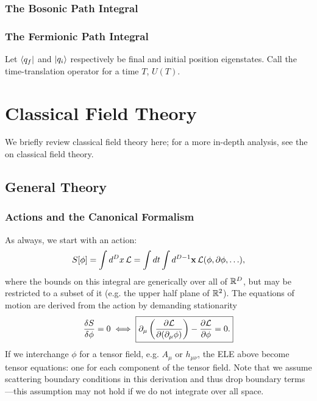 \documentclass[11pt]{article}
\newcommand{\fd}[2]{\frac{\delta #1}{\delta #2}} %
\begin{document}
\subsubsection{The Bosonic Path Integral}


\subsubsection{The Fermionic Path Integral}

\begin{iidea}
    Let $\langle q_f\rvert$ and $\lvert q_i\rangle$ respectively be final
    and initial position eigenstates. Call the time-translation
    operator for a time $T$, $U(T)$. 
\end{iidea}


\section{Classical Field Theory}

We briefly review classical field theory here; for a more in-depth analysis,
see the  on classical field theory.

\subsection{General Theory}

\subsubsection{Actions and the Canonical Formalism}

As always, we start with an action:
\begin{align*}
    S[\phi] = \int d^D x \, \mathcal{L} = \int dt \int d^{D - 1}\mathbf{x} \, \mathcal{L}(\phi, \partial \phi, \ldots),
\end{align*}
where the bounds on this integral are generically over all of $\mathbb{R}^D$,
but may be restricted to a subset of it (e.g. the upper half plane of $\mathbb{R}^2$).
The equations of motion are derived from the action by demanding stationarity
\begin{align*}
    \fd{S}{\phi} = 0 \iff \boxed{\partial_\mu \left( \pd{\el}{(\partial_\mu \phi)} \right) - \pd{\el}{\phi} = 0.}
\end{align*}
If we interchange $\phi$ for a tensor field, e.g. $A_\mu$ or $h_{\mu \nu}$,
the ELE above become tensor equations: one for each component of the tensor
field. Note that we assume scattering boundary conditions in this derivation
and thus drop boundary terms---this assumption may not hold if we do not integrate
over all space.
\end{document}
